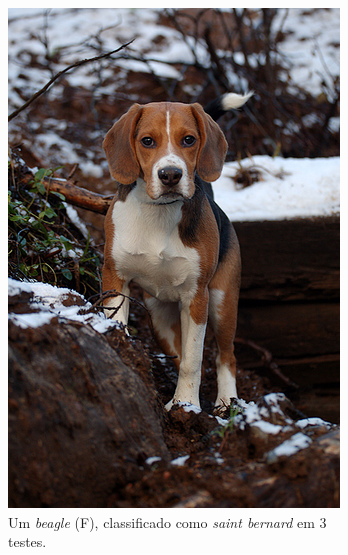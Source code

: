 \begin{figure}
  \centering
  \begin{subfigure}[b]{0.4\textwidth}
    \includegraphics[width=\textwidth]{beagle_bad.jpg}
    \caption{Um \textit{beagle} (F), classificado como \textit{saint bernard} em 3 testes. }
  \end{subfigure}
  ~ 
  \begin{subfigure}[b]{0.4\textwidth}

\end{subfigure}
\end{figure}
